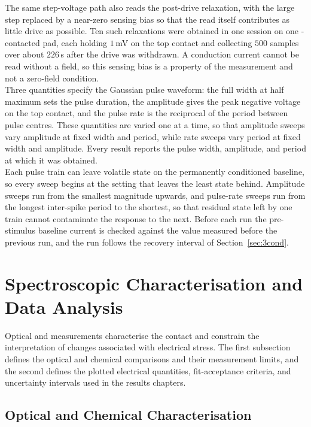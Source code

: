 \noindent The same step-voltage path also reads the post-drive relaxation, with the large step replaced by a
near-zero sensing bias so that the read itself contributes as little drive as possible. Ten such relaxations were
obtained in one session on one -contacted pad, each holding $1$\,mV on the top contact and collecting
$500$ samples over about $226$\,s after the drive was withdrawn. A conduction current cannot be read without a field,
so this sensing bias is a property of the measurement and not a zero-field condition.\\

\noindent Three quantities specify the Gaussian pulse waveform: the full width at half maximum sets the pulse
duration, the amplitude gives the peak negative voltage on the top contact, and the pulse rate is the reciprocal of
the period between pulse centres. These quantities are varied one at a time, so that amplitude sweeps vary amplitude at
fixed width and period, while rate sweeps vary period at fixed width and amplitude. Every result reports the pulse
width, amplitude, and period at which it was obtained.\\

\noindent Each pulse train can leave volatile state on the permanently conditioned baseline, so every sweep begins at
the setting that leaves the least state behind. Amplitude sweeps run from the smallest magnitude upwards, and
pulse-rate sweeps run from the longest inter-spike period to the shortest, so that residual state left by one train
cannot contaminate the response to the next. Before each run the pre-stimulus baseline current is checked against the
value measured before the previous run, and the run follows the recovery interval of Section~\ref{sec:3cond}.

\section[Spectroscopic Characterisation and Data Analysis]{Spectroscopic Characterisation and Data Analysis}

\noindent Optical and  measurements characterise the  contact and constrain the interpretation
of changes associated with electrical stress. The first subsection defines the optical and chemical comparisons and
their measurement limits, and the second defines the plotted electrical quantities, fit-acceptance criteria, and
uncertainty intervals used in the results chapters.

\subsection[Optical and Chemical Characterisation]{Optical and Chemical
Characterisation}\label{sec:3optical}

